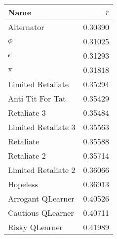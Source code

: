 \begin{tabular}{lr}
\toprule
Name                &       $\bar{r}$   \\
\midrule
Alternator          &                                 0.30390 \\
$\phi$              &                                 0.31025 \\
$e$                 &                                 0.31293 \\
$\pi$               &                                 0.31818 \\
Limited Retaliate   &                                 0.35294 \\
Anti Tit For Tat    &                                 0.35429 \\
Retaliate 3         &                                 0.35484 \\
Limited Retaliate 3 &                                 0.35563 \\
Retaliate           &                                 0.35588 \\
Retaliate 2         &                                 0.35714 \\
Limited Retaliate 2 &                                 0.36066 \\
Hopeless            &                                 0.36913 \\
Arrogant QLearner   &                                 0.40526 \\
Cautious QLearner   &                                 0.40711 \\
Risky QLearner      &                                 0.41989 \\
\bottomrule
\end{tabular}
